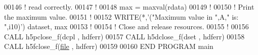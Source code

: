 \begin{DoxyCode}
00146   \textcolor{comment}{! read correctly.}
00147   \textcolor{comment}{!}
00148   max = maxval(rdata)
00149   \textcolor{comment}{!}
00150   \textcolor{comment}{! Print the maximum value.}
00151   \textcolor{comment}{!}
00152   \textcolor{keyword}{WRITE}(*,\textcolor{stringliteral}{'("Maximum value in ",A," is: ",i10)'}) dataset, max
00153   \textcolor{comment}{!}
00154   \textcolor{comment}{! Close and release resources.}
00155   \textcolor{comment}{!}
00156   \textcolor{keyword}{CALL }h5pclose\_f(dcpl , hdferr)
00157   \textcolor{keyword}{CALL }h5dclose\_f(dset , hdferr)
00158   \textcolor{keyword}{CALL }h5fclose\_f(\hyperlink{structfile}{file} , hdferr)
00159 
00160 \textcolor{keyword}{END PROGRAM }main
\end{DoxyCode}
